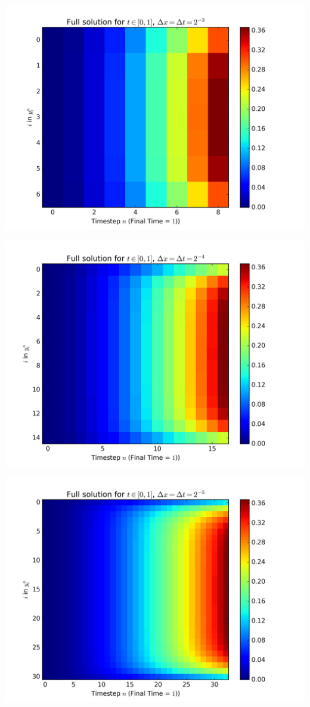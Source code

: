 \documentclass{article} %
\theoremstyle{plain}
\numberwithin{equation}{section} %
\numberwithin{figure}{section} %
\numberwithin{table}{section} %
\begin{document}
\begin{minipage}{0.5\textwidth}
    \includegraphics[width=\textwidth]{problem_2_0.png}
\end{minipage}\hfill
\begin{minipage}{0.5\textwidth}
    \includegraphics[width=\textwidth]{problem_2_1.png}
\end{minipage}
\begin{minipage}{0.5\textwidth}
    \includegraphics[width=\textwidth]{problem_2_2.png}
\end{minipage}\hfill
\end{document}
